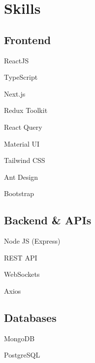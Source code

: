 \documentclass[]{deedy-resume}
\begin{document}
\lastupdated


\begin{minipage}[t]{0.33\textwidth}

\section{Skills}
\subsection{Frontend}
\vspace{\topsep}
\begin{tightemize}
\item ReactJS
\item TypeScript
\item Next.js
\item Redux Toolkit
\item React Query
\item Material UI
\item Tailwind CSS
\item Ant Design
\item Bootstrap
\end{tightemize}
\sectionsep

\subsection{Backend \& APIs}
\vspace{\topsep}
\begin{tightemize}
\item Node JS (Express)
\item REST API
\item WebSockets
\item Axios
\end{tightemize}
\sectionsep

\subsection{Databases}
\vspace{\topsep}
\begin{tightemize}
\item MongoDB
\item PostgreSQL
\end{tightemize}
\sectionsep


\end{minipage}
\end{document}
